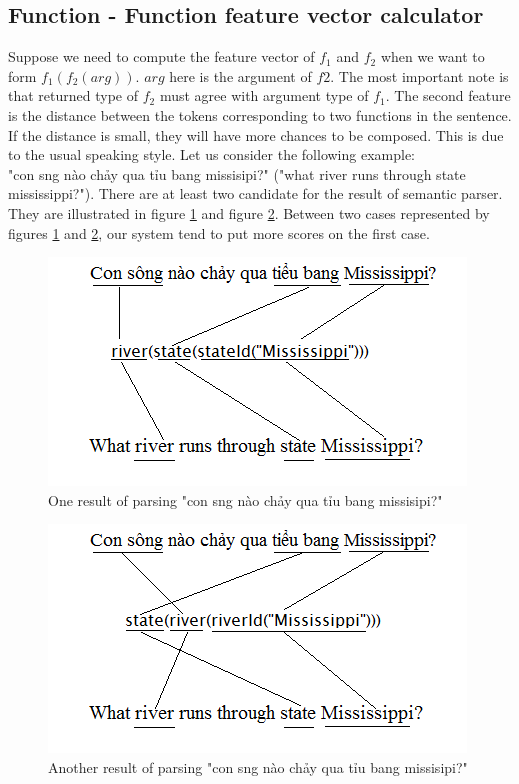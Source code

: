 \subsection{Function - Function feature vector calculator}
\label{sec:model.function-function}
Suppose we need to compute the feature vector of $f_1$ and $f_2$ when we want to form $f_1(f_2(arg))$. $arg$ here is the argument of $f2$. The most important note is that returned type of $f_2$ must agree with argument type of $f_1$. The second feature is the distance between the tokens corresponding to two functions in the sentence. If the distance is small, they will have more chances to be composed. This is due to the usual speaking style. Let us consider the following example: \\
 "{\selectfont con s\ocircumflex ng n\`ao ch\h{a}y qua ti\h\ecircumflex u bang missisipi?" ("what river runs through state mississippi?")}. There are at least two candidate for the result of semantic parser. They are illustrated in figure \ref{f-f.eg1} and figure \ref{f-f.eg2}. Between two cases represented by figures \ref{f-f.eg1} and \ref{f-f.eg2}, our system tend to put more scores on the first case.
\begin{figure}[h]
\centering
\includegraphics[scale=0.7]{eg-function-function-mapping1.png}
\caption{One result of parsing "{\selectfont con s\ocircumflex ng n\`ao ch\h{a}y qua ti\h\ecircumflex u bang missisipi?}"}
\label{f-f.eg1}
\end{figure}

\begin{figure}[ht!]
\centering
\includegraphics[scale=0.7]{eg-function-function-mapping2.png}
\caption{Another result of parsing "{\selectfont con s\ocircumflex ng n\`ao ch\h{a}y qua ti\h\ecircumflex u bang missisipi?}"}
\label{f-f.eg2}
\end{figure}

